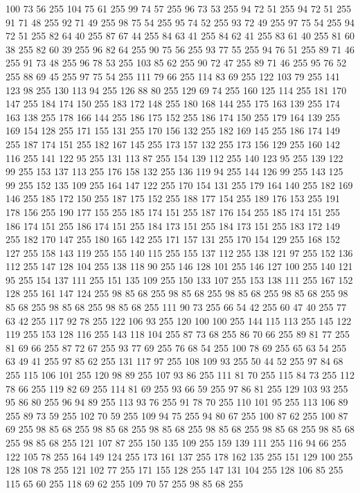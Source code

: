 100 73 56 255 104 75 61 255 99 74 57 255 96 73 53 255 94 72 51 255 94 72 51 255 91 71 48 255 92 71 49 255 98 75 54 255 95 74 52 255 93 72 49 255 97 75 54 255 94 72 51 255 82 64 40 255 87 67 44 255 84 63 41 255 84 62 41 255 83 61 40 255 81 60 38 255 82 60 39 255 96 82 64 255 90 75 56 255 93 77 55 255 94 76 51 255 89 71 46 255 91 73 48 255 96 78 53 255 103 85 62 255 90 72 47 255 89 71 46 255 95 76 52 255 88 69 45 255 97 75 54 255 111 79 66 255 114 83 69 255 122 103 79 255 141 123 98 255 130 113 94 255 126 88 80 255 129 69 74 255 160 125 114 255 181 170 147 255 184 174 150 255 183 172 148 255 180 168 144 255 175 163 139 255 174 163 138 255 178 166 144 255 186 175 152 255 186 174 150 255 179 164 139 255 169 154 128 255 171 155 131 255 170 156 132 255 182 169 145 255 186 174 149 255 187 174 151 255 182 167 145 255 173 157 132 255 173 156 129 255 160 142 116 255 141 122 95 255 131 113 87 255 154 139 112 255
140 123 95 255 139 122 99 255 153 137 113 255 176 158 132 255 136 119 94 255 144 126 99 255 143 125 99 255 152 135 109 255 164 147 122 255 170 154 131 255 179 164 140 255 182 169 146 255 185 172 150 255 187 175 152 255 188 177 154 255 189 176 153 255 191 178 156 255 190 177 155 255 185 174 151 255 187 176 154 255 185 174 151 255 186 174 151 255 186 174 151 255 184 173 151 255 184 173 151 255 183 172 149 255 182 170 147 255 180 165 142 255 171 157 131 255 170 154 129 255 168 152 127 255 158 143 119 255 155 140 115 255 155 137 112 255 138 121 97 255 152 136 112 255 147 128 104 255 138 118 90 255 146 128 101 255 146 127 100 255 140 121 95 255 154 137 111 255 151 135 109 255 150 133 107 255 153 138 111 255 167 152 128 255 161 147 124 255 98 85 68 255 98 85 68 255 98 85 68 255 98 85 68 255 98 85 68 255 98 85 68 255 98 85 68 255 111 90 73 255 66 54 42 255 60 47 40 255 77 63 42 255 117 92 78 255 122 106 93 255 120 100 100 255 144 115 113 255 145 122 119 255 153 128 116 255
143 118 104 255 87 73 68 255 86 70 66 255 89 81 77 255 81 69 66 255 87 72 67 255 93 77 69 255 76 68 54 255 100 78 69 255 65 63 54 255 63 49 41 255 97 85 62 255 131 117 97 255 108 109 93 255 50 44 52 255 97 84 68 255 115 106 101 255 120 98 89 255 107 93 86 255 111 81 70 255 115 84 73 255 112 78 66 255 119 82 69 255 114 81 69 255 93 66 59 255 97 86 81 255 129 103 93 255 95 86 80 255 96 94 89 255 113 93 76 255 91 78 70 255 110 101 95 255 113 106 89 255 89 73 59 255 102 70 59 255 109 94 75 255 94 80 67 255 100 87 62 255 100 87 69 255 98 85 68 255 98 85 68 255 98 85 68 255 98 85 68 255 98 85 68 255 98 85 68 255 98 85 68 255 121 107 87 255 150 135 109 255 159 139 111 255 116 94 66 255 122 105 78 255 164 149 124 255 173 161 137 255 178 162 135 255 151 129 100 255 128 108 78 255 121 102 77 255 171 155 128 255 147 131 104 255 128 106 85 255 115 65 60 255 118 69 62 255 109 70 57 255 98 85 68 255
